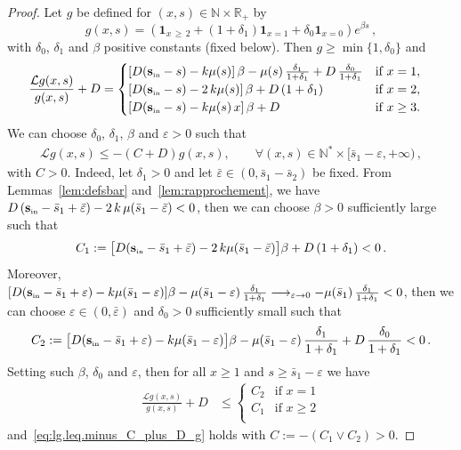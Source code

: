 \documentclass[AHL,Unicode,longabstracts,published]{cedram}
\newcommand{\RR}{\mathbb{R}}
\newcommand{\NN}{\mathbb{N}}
\newcommand{\clL}{\mathcal{L}}
\newcommand{\Sin}{{\mathbf s}_{\textrm{\tiny\rm in}}}
\newcommand{\1}{\mathbf{1}}
\let\oldforall\forall
\renewcommand*{\forall}{\mathrel{\oldforall}}
\begin{document}
\begin{proof}
Let $g$ be defined for $(x,s)\in \NN\times \RR_+$ by
\[
g(x,s) = \left(\1_{x\,\geq\,2} + (1+\delta_1) \1_{x=1} +\delta_0 \1_{x=0} \right) e^{\beta s}\,,
\]
with $\delta_0$, $\delta_1$ and $\beta$ positive constants (fixed below). Then $g\geq \min\{1,\delta_0\}$ and
\begin{align*}
\frac{\clL g(x,s)}{g(x,s)} + D &=
\begin{cases}
\left[D(\Sin-s) - k \mu(s)\right] \beta - \mu(s)\, \frac{\delta_1}{1+\delta_1} + D\, \frac{\delta_0}{1+\delta_1}& \text{if } x = 1,\\
\left[D(\Sin-s) -2\, k \mu(s)\right] \beta + D\,(1+\delta_1) & \text{if } x=2,\\
\left[D(\Sin-s) - k \mu(s)\,x\right] \beta +D & \text{if } x\geq 3.
\end{cases}
\end{align*}
We can choose $\delta_0$, $\delta_1$, $\beta$ and $\varepsilon>0$ such that
\begin{align}\label{eq:lg.leq.minus_C_plus_D_g}
\clL g(x,s) \leq -(C+ D) g(x,s), \qquad \forall (x,s)\in \NN^*\times [\bar s_1-\varepsilon,+\infty)\,,
\end{align}
with $C>0$. Indeed, let $\delta_1>0$ and let $\bar \varepsilon\in (0,\bar s_1 - \bar s_2)$ be fixed. From Lemmas~\ref{lem:defsbar} and~\ref{lem:rapprochement}, we have $D\,(\Sin-\bar s_1+\bar \varepsilon)- 2\,k\,\mu(\bar s_1-\bar \varepsilon)<0$, then we can choose $\beta>0$ sufficiently large such that
\[
C_1 :=\big[D(\Sin-\bar s_1+\bar \varepsilon) -2\, k \mu(\bar s_1-\bar \varepsilon)\big] \beta + D\,(1+\delta_1) <0\,.
\]
Moreover, $[D(\Sin-\bar s_1+\varepsilon) - k \mu(\bar s_1-\varepsilon)] \beta - \mu(\bar s_1-\varepsilon)\, \frac{\delta_1}{1+\delta_1} \longrightarrow_{\varepsilon\to 0}- \mu(\bar s_1)\, \frac{\delta_1}{1+\delta_1}<0$, then we can choose $\varepsilon \in (0, \bar \varepsilon)$ and $\delta_0>0$ sufficiently small such that
\[
C_2 := \big[D(\Sin-\bar s_1+\varepsilon) - k \mu(\bar s_1-\varepsilon)\big] \beta - \mu(\bar s_1-\varepsilon)\, \frac{\delta_1}{1+\delta_1} + D\, \frac{\delta_0}{1+\delta_1}<0\,.
\]
Setting such $\beta$, $\delta_0$ and $\varepsilon$, then for all $x\geq 1$ and $s \geq \bar s_1-\varepsilon$ we have
\begin{align*}
\frac{\clL g(x,s)}{g(x,s)} + D &\leq
\begin{cases}
C_2 & \text{if } x = 1\\
C_1 & \text{if } x\geq 2\\
\end{cases}
\end{align*}
and~\eqref{eq:lg.leq.minus_C_plus_D_g} holds with $C:=-(C_1\vee C_2)>0$.



\end{proof}
\end{document}
